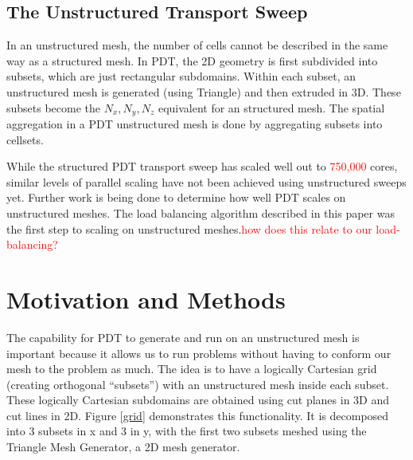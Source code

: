 \documentclass{anstrans}
\newcommand{\tcr}[1]{\textcolor{red}{#1}}
\begin{document}
\subsection{The Unstructured Transport Sweep}
In an unstructured mesh, the number of cells cannot be described in the same way as a structured mesh. In PDT, the 2D
geometry is first subdivided into subsets, which are just rectangular subdomains. Within each subset, an unstructured mesh is generated (using Triangle) and then extruded in 3D. These subsets become the $N_x, N_y, N_z$ equivalent for an structured mesh. The spatial aggregation in a PDT unstructured mesh is done by aggregating subsets into cellsets. 

While the structured PDT transport sweep has scaled well out to \tcr{750,000} cores, similar levels of parallel scaling have not been achieved using unstructured sweeps yet. Further work is being done to determine how well PDT scales on unstructured meshes. The load balancing algorithm described in this paper was the first step to scaling on unstructured meshes.\tcr{how does this relate to our load-balancing?}

\section{Motivation and Methods}
The capability for PDT to generate and run on an unstructured mesh is important because it allows us to run problems without having to conform our mesh to the problem as much. The idea is to have a logically Cartesian grid (creating orthogonal ``subsets'') with an unstructured mesh inside each subset. These logically Cartesian subdomains are obtained using cut planes in 3D and cut lines in 2D. Figure \ref{grid} demonstrates this functionality. It is decomposed into 3 subsets in x and 3 in y, with the first two subsets meshed using the Triangle Mesh Generator\cite{triangle}, a 2D mesh generator.
\end{document}
